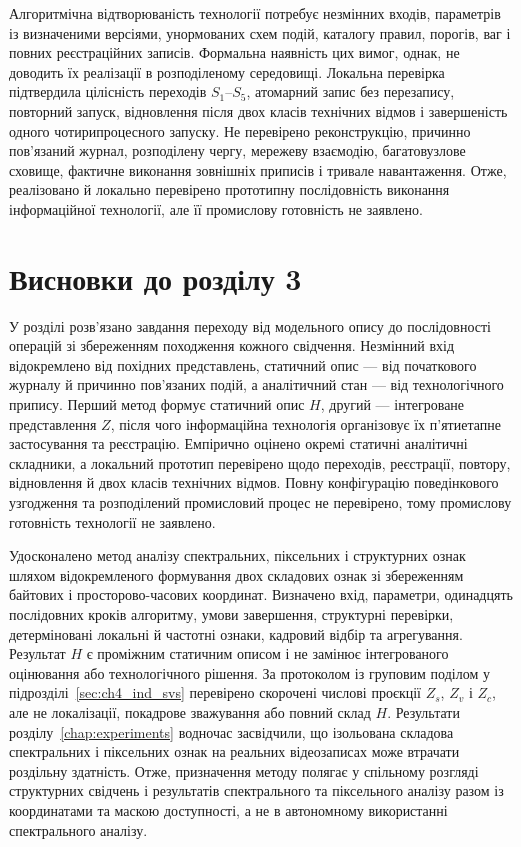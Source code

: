 Алгоритмічна відтворюваність технології потребує незмінних входів, параметрів із визначеними версіями, унормованих схем подій, каталогу правил, порогів, ваг і повних реєстраційних записів. Формальна наявність цих вимог, однак, не доводить їх реалізації в розподіленому середовищі. Локальна перевірка підтвердила цілісність переходів $S_1$--$S_5$, атомарний запис без перезапису, повторний запуск, відновлення після двох класів технічних відмов і завершеність одного чотирипроцесного запуску. Не перевірено реконструкцію, причинно пов’язаний журнал, розподілену чергу, мережеву взаємодію, багатовузлове сховище, фактичне виконання зовнішніх приписів і тривале навантаження. Отже, реалізовано й локально перевірено прототипну послідовність виконання інформаційної технології, але її промислову готовність не заявлено.

\section*{Висновки до розділу 3}
{}

У розділі розв’язано завдання переходу від модельного опису до послідовності операцій зі збереженням походження кожного свідчення. Незмінний вхід відокремлено від похідних представлень, статичний опис --- від початкового журналу й причинно пов’язаних подій, а аналітичний стан --- від технологічного припису. Перший метод формує статичний опис $H$, другий --- інтегроване представлення $Z$, після чого інформаційна технологія організовує їх п’ятиетапне застосування та реєстрацію. Емпірично оцінено окремі статичні аналітичні складники, а локальний прототип перевірено щодо переходів, реєстрації, повтору, відновлення й двох класів технічних відмов. Повну конфігурацію поведінкового узгодження та розподілений промисловий процес не перевірено, тому промислову готовність технології не заявлено.

Удосконалено метод аналізу спектральних, піксельних і структурних ознак шляхом відокремленого формування двох складових ознак зі збереженням байтових і просторово-часових координат. Визначено вхід, параметри, одинадцять послідовних кроків алгоритму, умови завершення, структурні перевірки, детерміновані локальні й частотні ознаки, кадровий відбір та агрегування. Результат $H$ є проміжним статичним описом і не замінює інтегрованого оцінювання або технологічного рішення. За протоколом із груповим поділом у підрозділі~\ref{sec:ch4_ind_svs} перевірено скорочені числові проєкції $Z_s$, $Z_v$ і $Z_c$, але не локалізації, покадрове зважування або повний склад $H$. Результати розділу~\ref{chap:experiments} водночас засвідчили, що ізольована складова спектральних і піксельних ознак на реальних відеозаписах може втрачати роздільну здатність. Отже, призначення методу полягає у спільному розгляді структурних свідчень і результатів спектрального та піксельного аналізу разом із координатами та маскою доступності, а не в автономному використанні спектрального аналізу.

